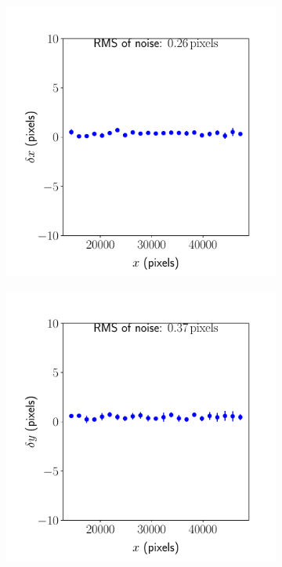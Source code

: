 \documentclass{article}
\begin{document}
\begin{figure}[ht]
\begin{subfigure}{0.24\linewidth}
		\caption{}
		\label{fig:sinewave2yyJHUPolaris}
	\end{subfigure}
	\begin{subfigure}{0.24\linewidth}
		\includegraphics[width=\linewidth]{sine-wave-4-xx-JHUPolaris.pdf}
		\caption{}
		\label{fig:sinewave4xxJHUPolaris}
	\end{subfigure}
	\begin{subfigure}{0.24\linewidth}
		\includegraphics[width=\linewidth]{sine-wave-4-yx-JHUPolaris.pdf}

\end{subfigure}
\end{figure}
\end{document}
